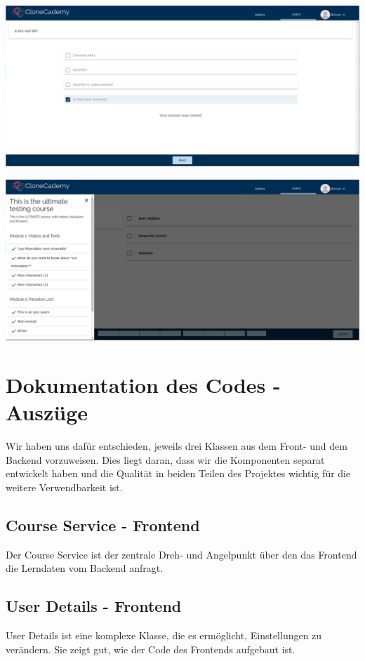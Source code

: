 \documentclass[accentcolor=tud0b,12pt,paper=a4]{tudreport}
\begin{document}
	\includegraphics[height=0.3\textheight]{appendix/screenshots/screenshot-0.jpg}

	\includegraphics[height=0.3\textheight]{appendix/screenshots/question-0.jpeg}



\chapter{Dokumentation des Codes - Auszüge}

	Wir haben uns dafür entschieden, jeweils drei Klassen aus dem Front- und dem Backend vorzuweisen. Dies liegt daran, dass wir die Komponenten separat entwickelt haben und die Qualität in beiden Teilen des Projektes wichtig für die weitere Verwendbarkeit ist.

	\section*{Course Service - Frontend}
	Der Course Service ist der zentrale Dreh- und Angelpunkt über den das Frontend die Lerndaten vom Backend anfragt.

	

	\section*{User Details - Frontend}
	User Details ist eine komplexe Klasse, die es ermöglicht, Einstellungen zu verändern. Sie zeigt gut, wie der Code des Frontends aufgebaut ist.
\end{document}
